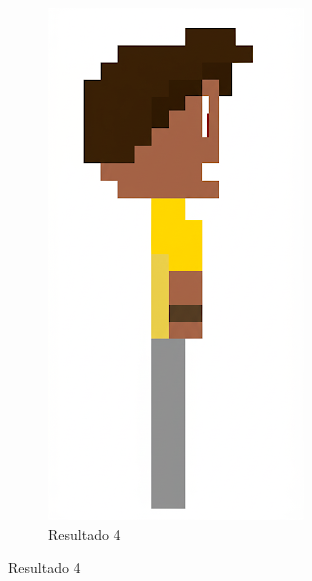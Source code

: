 \begin{figure}[htbp]
\begin{subfigure}{0.23\linewidth}
        \includegraphics[width=1\linewidth]{figs/geminiPro/chat5/tela1_res3.PNG}
        \caption{\small Resultado 4}
        \label{fig:geminiPro7d}
    \end{subfigure}
\end{figure}


